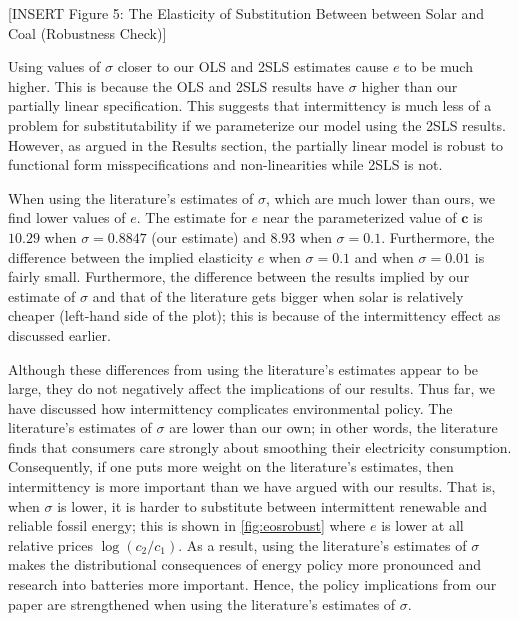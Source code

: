 \documentclass[11pt,a4paper,leqno]{extarticle}
\begin{document}
	
	\vspace{0.15in}
	\begin{center}
		[INSERT Figure 5: The Elasticity of Substitution Between between Solar and Coal \newline  (Robustness Check)]
	\end{center}
	\vspace{0.15in}
	
	Using values of $\sigma$ closer to our OLS and 2SLS estimates cause $e$ to be much higher. This is because the OLS and 2SLS results have $\sigma$ higher than our partially linear specification. This suggests that intermittency is much less of a problem for substitutability if we parameterize our model using the 2SLS results. However, as argued in the Results section, the partially linear model is robust to functional form misspecifications and non-linearities while 2SLS is not. 
	
	When using the literature's estimates of $\sigma$, which are much lower than ours, we find  lower values of  $e$. The estimate for $e$ near the parameterized value of $\mathbf{c}$ is  $10.29$ when $\sigma = 0.8847$ (our estimate) and $8.93$ when $\sigma = 0.1$. Furthermore, the difference between the implied elasticity $e$ when $\sigma = 0.1$ and when $\sigma = 0.01$ is fairly small. Furthermore, the difference between the results implied by our estimate of $\sigma$ and that of the literature gets  bigger when solar is relatively cheaper (left-hand side of the plot); this is because of the intermittency effect as discussed earlier.
	
	
	Although these differences from using the literature's estimates appear to be large, they do not negatively affect the implications of our results. Thus far, we have discussed how intermittency complicates environmental policy. The literature's estimates of $\sigma$ are lower than our own; in other words, the literature finds that consumers care strongly about smoothing their electricity consumption.  Consequently, if one puts more weight on the literature's estimates, then intermittency is more important than we have argued with our results. That is, when $\sigma$ is lower, it is harder to substitute between intermittent renewable and reliable fossil energy; this is shown in \autoref{fig:eosrobust} where $e$ is lower at all relative prices $\log(c_2/c_1)$. As a result, using the literature's estimates of $\sigma$ makes the distributional consequences of energy policy more pronounced and research into batteries more important. Hence, the policy implications from our paper are strengthened when using the literature's estimates of $\sigma$. 
	
\end{document}
